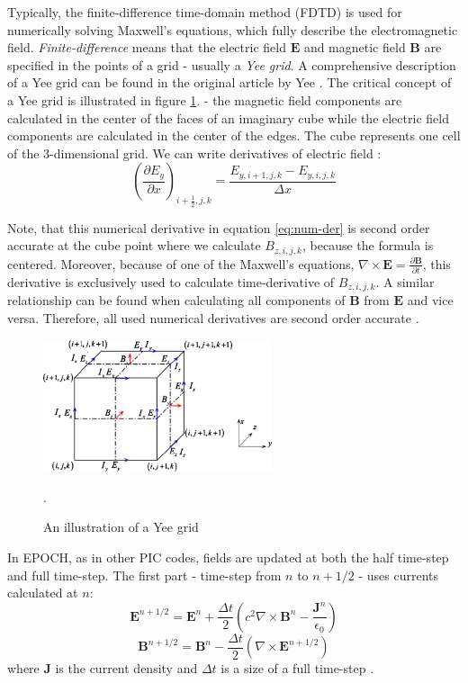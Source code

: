 Typically, the finite-difference time-domain method (FDTD) is used for numerically solving Maxwell's equations, which fully describe the electromagnetic field. \textit{Finite-difference} means that the electric field $\bm{E}$ and magnetic field $\bm{B}$ are specified in the points of a grid - usually a \textit{Yee grid}. A comprehensive description of a Yee grid can be found in the original article by Yee \cite{yee1966}. The critical concept of a Yee grid is illustrated in figure \ref{fig:yee-grid}. - the magnetic field components are calculated in the center of the faces of an imaginary cube while the electric field components are calculated in the center of the edges. The cube represents one cell of the 3-dimensional grid. We can write derivatives of electric field \cite{arber2015}:
\begin{equation}
	\label{eq:num-der}
	\left(\frac{\partial E_y}{\partial x}\right)_{i+\frac{1}{2},j,k} = \frac{E_{y,i+1,j,k}-E_{y,i,j,k}}{\Delta x} 
\end{equation}

Note, that this numerical derivative in equation \ref{eq:num-der} is second order accurate at the cube point where we calculate $B_{z,i,j,k}$, because the formula is centered. Moreover, because of one of the Maxwell's equations, $\nabla \times \bm{E} = \frac{\partial \bm{B}}{\partial t}$, this derivative is exclusively used to calculate time-derivative of $B_{z,i,j,k}$. A similar relationship can be found when calculating all components of $\bm{B}$ from $\bm{E}$ and vice versa. Therefore, all used numerical derivatives are second order accurate \cite{arber2015}.

\begin{figure}[t]
	\centering
	\includegraphics[width=0.6\textwidth]{figures/yee-grid}
	\caption{An illustration of a Yee grid \cite{wang2010}}.
	\label{fig:yee-grid}
\end{figure}

In EPOCH, as in other PIC codes, fields are updated at both the half time-step and full time-step. The first part - time-step from $n$ to $n+1/2$ - uses currents calculated at $n$:
\begin{equation}
	\bm{E}^{n+1/2} = \bm{E}^n + \frac{\Delta t}{2}\left(c^2 \nabla\times\bm{B}^n - \frac{\bm{J}^n}{\epsilon_0}\right)
\end{equation}
\begin{equation} 
	\bm{B}^{n+1/2} = \bm{B}^n - \frac{\Delta t}{2}\left(\nabla\times\bm{E}^{n+1/2} \right)
\end{equation}
where $\bm{J}$ is the current density and $\Delta t$ is a size of a full time-step \cite{arber2015}.


